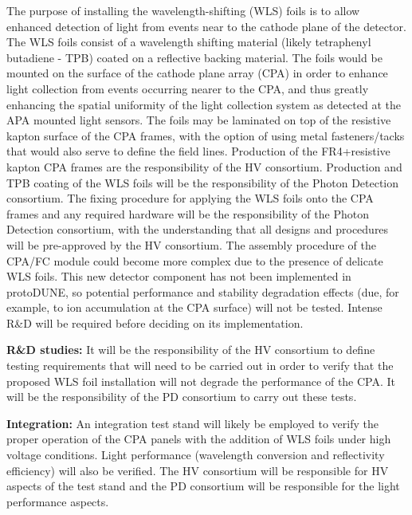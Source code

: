 The purpose of installing the wavelength-shifting (WLS) foils is to allow enhanced detection of light from events near to the cathode plane of the detector. The WLS foils consist of a wavelength shifting material (likely tetraphenyl butadiene - TPB) coated on a reflective backing material. The foils would be mounted on the surface of the cathode plane array (CPA) in order to enhance light collection from events occurring nearer to the CPA, and thus greatly enhancing the spatial uniformity of the light collection system as detected at the APA mounted light sensors. The foils may be laminated on top of the resistive kapton surface of the CPA frames, with the option of using metal fasteners/tacks that would also serve to define the field lines. Production of the FR4+resistive kapton CPA frames are the responsibility of the HV consortium. Production and TPB coating of the WLS foils will be the responsibility of the Photon Detection consortium. The fixing procedure for applying the WLS foils onto the CPA frames and any required hardware will be the responsibility of the Photon Detection consortium, with the understanding that all designs and procedures will be pre-approved by the HV consortium. The assembly procedure of the CPA/FC module could become more complex due to the presence of delicate WLS foils. This new detector component has not been implemented in protoDUNE, so potential performance and stability degradation effects (due, for example, to ion accumulation at the CPA surface) will not be tested.  Intense R\&D will be required before deciding on its implementation.

\textbf{R\&D studies: }It will be the responsibility of the HV consortium to define testing requirements that will need to be carried out in order to verify that the proposed WLS foil installation will not degrade the performance of the CPA. It will be the responsibility of the PD consortium to carry out these tests.

\textbf{Integration:} An integration test stand will likely be employed to verify the proper operation of the CPA panels with the addition of WLS foils under high voltage conditions. Light performance (wavelength conversion and reflectivity efficiency) will also be verified. The HV consortium will be responsible for HV aspects of the test stand and the PD consortium will be responsible for the light performance aspects.

